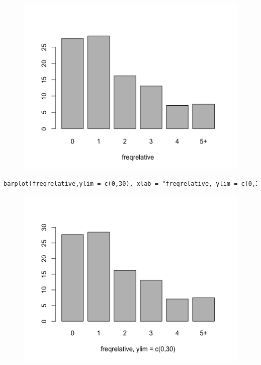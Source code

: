 \begin{figure}[H]\begin{center}\includegraphics[scale=0.45]{ilu/lab2-1.png}\end{center}\end{figure}

\begin{lstlisting}[language=html]
barplot(freqrelative,ylim = c(0,30), xlab = "freqrelative, ylim = c(0,30)")
\end{lstlisting}
\begin{figure}[H]\begin{center}\includegraphics[scale=0.45]{ilu/lab2-2.png}\end{center}\end{figure}

